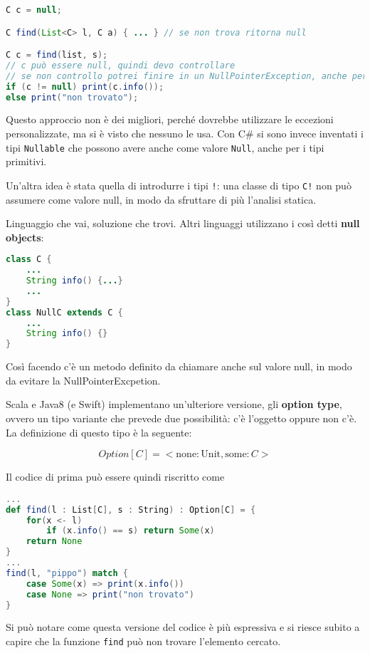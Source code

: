 \begin{lstlisting}[language=Java]
C c = null;

C find(List<C> l, C a) { ... } // se non trova ritorna null

C c = find(list, s);
// c può essere null, quindi devo controllare
// se non controllo potrei finire in un NullPointerException, anche perché il compilatore non controlla questo tipo di eccezioni
if (c != null) print(c.info());
else print("non trovato");
\end{lstlisting}

\noindent Questo approccio non è dei migliori, perché dovrebbe utilizzare le eccezioni personalizzate, ma si è visto che nessuno le usa. Con C\# si sono invece inventati i tipi \texttt{Nullable} che possono avere anche come valore \texttt{Null}, anche per i tipi primitivi.

Un'altra idea è stata quella di introdurre i tipi \texttt{!}: una classe di tipo \texttt{C!} non può assumere come valore null, in modo da sfruttare di più l'analisi statica.

Linguaggio che vai, soluzione che trovi. Altri linguaggi utilizzano i così detti \textbf{null objects}:

\begin{lstlisting}[language=Java]
class C {
	...
	String info() {...}
	...
}
class NullC extends C {
	...
	String info() {}
}
\end{lstlisting}

\noindent Così facendo c'è un metodo definito da chiamare anche sul valore null, in modo da evitare la NullPointerExcpetion.

Scala e Java8 (e Swift) implementano un'ulteriore versione, gli \textbf{option type}, ovvero un tipo variante che prevede due possibilità: c'è l'oggetto oppure non c'è.
La definizione di questo tipo è la seguente:

$$
Option[C] = < \text{none} : \text{Unit}, \text{some} : C >
$$

\noindent Il codice di prima può essere quindi riscritto come

\begin{lstlisting}[language=Scala]
...
def find(l : List[C], s : String) : Option[C] = {
	for(x <- l) 
		if (x.info() == s) return Some(x)
	return None 
}
...
find(l, "pippo") match {
	case Some(x) => print(x.info())
	case None => print("non trovato")
}
\end{lstlisting}

\noindent Si può notare come questa versione del codice è più espressiva e si riesce subito a capire che la funzione \texttt{find} può non trovare l'elemento cercato.


